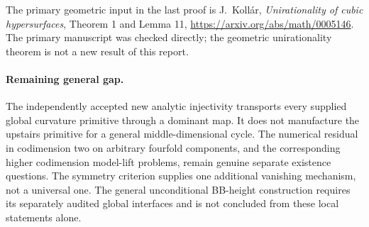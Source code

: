The primary geometric input in the last proof is
J.~Koll\'ar, \emph{Unirationality of cubic hypersurfaces},
Theorem 1 and Lemma 11, \url{https://arxiv.org/abs/math/0005146}.
The primary manuscript was checked directly; the geometric
unirationality theorem is not a new result of this report.

\paragraph{Remaining general gap.}
The independently accepted new analytic injectivity transports
every supplied global curvature primitive through a
dominant map.  It does not manufacture the upstairs
primitive for a general middle-dimensional cycle.
The numerical residual in codimension two on arbitrary
fourfold components, and the corresponding higher
codimension model-lift problems, remain genuine
separate existence questions.  The symmetry criterion
supplies one additional vanishing mechanism, not a
universal one.  The general unconditional BB-height
construction requires its separately audited global
interfaces and is not concluded from these local
statements alone.
